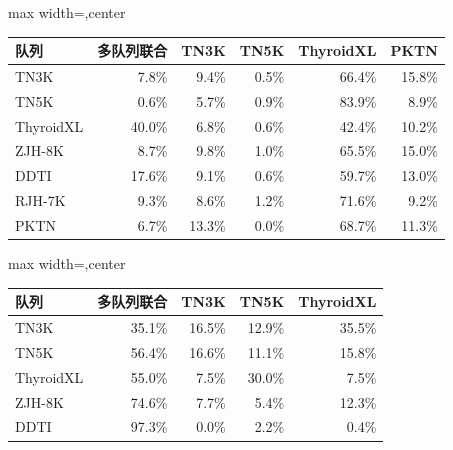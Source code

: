 \begin{responsetable}
\caption{}
\begin{adjustbox}{max width=\textwidth,center}
\begin{tabular}{@{}l r r r r r@{}}
\toprule
队列 & 多队列联合 & TN3K & TN5K & ThyroidXL & PKTN \\
\midrule
TN3K & 7.8\% & 9.4\% & 0.5\% & 66.4\% & 15.8\% \\
TN5K & 0.6\% & 5.7\% & 0.9\% & 83.9\% & 8.9\% \\
ThyroidXL & 40.0\% & 6.8\% & 0.6\% & 42.4\% & 10.2\% \\
ZJH-8K & 8.7\% & 9.8\% & 1.0\% & 65.5\% & 15.0\% \\
DDTI & 17.6\% & 9.1\% & 0.6\% & 59.7\% & 13.0\% \\
RJH-7K & 9.3\% & 8.6\% & 1.2\% & 71.6\% & 9.2\% \\
PKTN & 6.7\% & 13.3\% & 0.0\% & 68.7\% & 11.3\% \\
\bottomrule
\end{tabular}
\end{adjustbox}
\end{responsetable}
\begin{responsetable}
\caption{}
\begin{adjustbox}{max width=\textwidth,center}
\begin{tabular}{@{}l r r r r@{}}
\toprule
队列 & 多队列联合 & TN3K & TN5K & ThyroidXL \\
\midrule
TN3K & 35.1\% & 16.5\% & 12.9\% & 35.5\% \\
TN5K & 56.4\% & 16.6\% & 11.1\% & 15.8\% \\
ThyroidXL & 55.0\% & 7.5\% & 30.0\% & 7.5\% \\
ZJH-8K & 74.6\% & 7.7\% & 5.4\% & 12.3\% \\
DDTI & 97.3\% & 0.0\% & 2.2\% & 0.4\% \\
\bottomrule
\end{tabular}
\end{adjustbox}
\end{responsetable}
